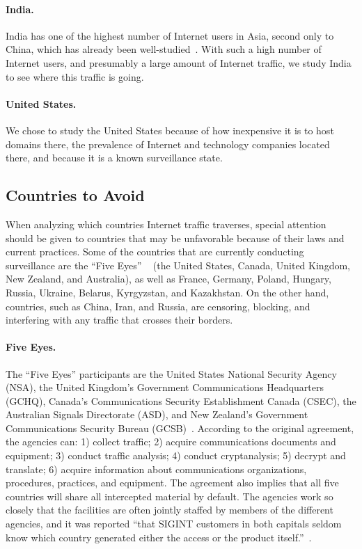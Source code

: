 \paragraph{India.}  India has one of the highest number of Internet users in Asia, second only to China, which has already been well-studied~\cite{tsui2003panopticon, wang2010discourse}.  With such a high number of Internet users, and presumably a large amount of Internet traffic, we study India to see where this traffic is going.

\paragraph{United States.}  We chose to study the United States because of how inexpensive it is to host domains there, the prevalence of Internet and technology companies located there, and because it is a known surveillance state.

\subsection{Countries to Avoid}

When analyzing which countries Internet traffic traverses, special attention should be given to countries that may be unfavorable because of their laws and current practices.  Some of the countries that are currently conducting surveillance are the ``Five Eyes'' ~\cite{lander2004international, eyeswideopen} (the United States, Canada, United Kingdom, New Zealand, and Australia), as well as France, Germany, Poland, Hungary, Russia, Ukraine, Belarus, Kyrgyzstan, and Kazakhstan.  On the other hand, countries, such as China, Iran, and Russia, are censoring, blocking, and interfering with any traffic that crosses their borders.

\paragraph{Five Eyes.} The ``Five Eyes'' participants are the United States National Security Agency (NSA), the United Kingdom's Government Communications Headquarters (GCHQ), Canada's Communications Security Establishment Canada (CSEC), the Australian Signals Directorate (ASD), and New Zealand's Government Communications Security Bureau (GCSB)~\cite{eyeswideopen}.  According to the original agreement, the agencies can: 1) collect traffic; 2) acquire communications documents and equipment; 3) conduct traffic analysis; 4) conduct cryptanalysis; 5) decrypt and translate; 6) acquire information about communications organizations, procedures, practices, and equipment.  The agreement also implies that all five countries will share all intercepted material by default.  The agencies work so closely that the facilities are often jointly staffed by members of the different agencies, and it was reported ``that SIGINT customers in both capitals seldom know which country generated either the access or the product itself.''~\cite{lander2004international}.

